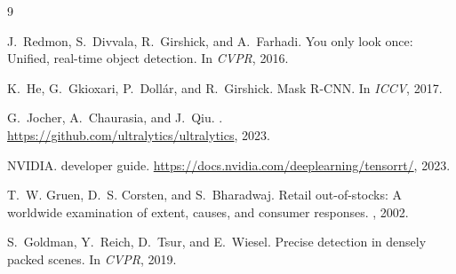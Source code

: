 \documentclass[10pt,twocolumn,letterpaper]{article}
\begin{document}
{\small

\begin{thebibliography}{9}

J.~Redmon, S.~Divvala, R.~Girshick, and A.~Farhadi.
\newblock You only look once: Unified, real-time object detection.
\newblock In {\em CVPR}, 2016.

K.~He, G.~Gkioxari, P.~Doll{\'a}r, and R.~Girshick.
\newblock Mask {R-CNN}.
\newblock In {\em ICCV}, 2017.

G.~Jocher, A.~Chaurasia, and J.~Qiu.
.
\newblock \url{https://github.com/ultralytics/ultralytics}, 2023.

NVIDIA.
 developer guide.
\newblock \url{https://docs.nvidia.com/deeplearning/tensorrt/}, 2023.

T.~W. Gruen, D.~S. Corsten, and S.~Bharadwaj.
\newblock Retail out-of-stocks: A worldwide examination of extent, causes, and
  consumer responses.
, 2002.

S.~Goldman, Y.~Reich, D.~Tsur, and E.~Wiesel.
\newblock Precise detection in densely packed scenes.
\newblock In {\em CVPR}, 2019.

\end{thebibliography}
}
\end{document}
